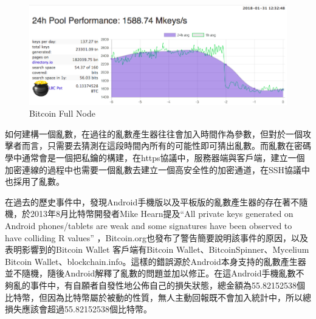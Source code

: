 			\begin{figure}[h]
				\centering
				\includegraphics[width = .9\textwidth]{LBC.png}
				\caption{Bitcoin Full Node\parencite{TheLargeBitcoinCollider}}\label{LBC}
			\end{figure}

			如何建構一個亂數，在過往的亂數產生器往往會加入時間作為參數，但對於一個攻擊者而言，只需要去猜測在這段時間內所有的可能性即可猜出亂數。而亂數在密碼學中通常會是一個把私鑰的構建，在https協議中，服務器端與客戶端，建立一個加密連線的過程中也需要一個亂數去建立一個高安全性的加密通道，在SSH協議中也採用了亂數。
	
			在過去的歷史事件中，發現Android手機版以及平板版的亂數產生器的存在著不隨機，於2013年8月比特幣開發者Mike Hearn提及“All private keys generated on Android phones/tablets are weak and some signatures have been observed to have colliding R values” \parencite{SomeSecureRandomThoughts}，Bitcoin.org也發布了警告\parencite{AndroidSecurityVulnerability}簡要說明該事件的原因，以及表明影響到的Bitcoin Wallet 客戶端有Bitcoin Wallet、BitcoinSpinner、Mycelium Bitcoin Wallet、blockchain.info。這樣的錯誤源於Android本身支持的亂數產生器並不隨機，隨後Android解釋了亂數的問題並加以修正。在這Android手機亂數不夠亂的事件中，有自願者自發性地公佈自己的損失狀態，總金額為55.82152538個比特幣\parencite{Badsignaturesleading}，但因為比特幣屬於被動的性質，無人主動回報既不會加入統計中，所以總損失應該會超過55.82152538個比特幣。

